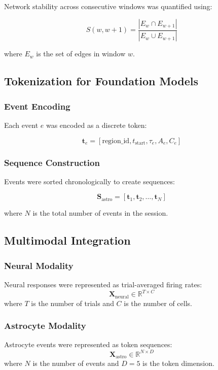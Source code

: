 \documentclass[11pt,twocolumn]{article}
\begin{document}
Network stability across consecutive windows was quantified using:

\begin{equation}
S(w, w+1) = \frac{|E_w \cap E_{w+1}|}{|E_w \cup E_{w+1}|}
\end{equation}

where $E_w$ is the set of edges in window $w$.

\subsection{Tokenization for Foundation Models}

\subsubsection{Event Encoding}
Each event $e$ was encoded as a discrete token:

\begin{equation}
\mathbf{t}_e = [\text{region\_id}, t_{\text{start}}, \tau_e, A_e, C_e]
\end{equation}

\subsubsection{Sequence Construction}
Events were sorted chronologically to create sequences:

\begin{equation}
\mathbf{S}_{\text{astro}} = [\mathbf{t}_1, \mathbf{t}_2, \ldots, \mathbf{t}_N]
\end{equation}

where $N$ is the total number of events in the session.

\subsection{Multimodal Integration}

\subsubsection{Neural Modality}
Neural responses were represented as trial-averaged firing rates:
\begin{equation}
\mathbf{X}_{\text{neural}} \in \mathbb{R}^{T \times C}
\end{equation}
where $T$ is the number of trials and $C$ is the number of cells.

\subsubsection{Astrocyte Modality}
Astrocyte events were represented as token sequences:
\begin{equation}
\mathbf{X}_{\text{astro}} \in \mathbb{R}^{N \times D}
\end{equation}
where $N$ is the number of events and $D = 5$ is the token dimension.
\end{document}
